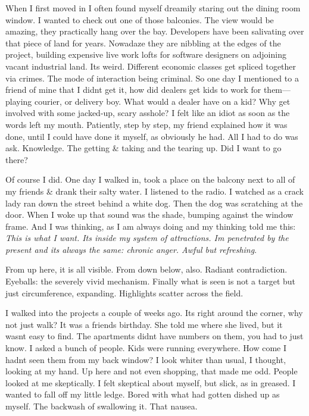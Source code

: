 \documentclass[
]{memoir}
\begin{document}
When I first moved in I often found myself dreamily staring out the
dining room window. I wanted to check out one of those balconies. The
view would be amazing, they practically hang over the bay. Developers
have been salivating over that piece of land for years. Nowadaze they
are nibbling at the edges of the project, building expensive live work
lofts for software designers on adjoining vacant industrial land. Its
weird. Different economic classes get spliced together via crimes. The
mode of interaction being criminal. So one day I mentioned to a friend
of mine that I didnt get it, how did dealers get kids to work for
them---playing courier, or delivery boy. What would a dealer have on a
kid? Why get involved with some jacked-up, scary asshole? I felt like an
idiot as soon as the words left my mouth. Patiently, step by step, my
friend explained how it was done, until I could have done it myself, as
obviously he had. All I had to do was ask. Knowledge. The getting \&
taking and the tearing up. Did I want to go there?

Of course I did. One day I walked in, took a place on the balcony next
to all of my friends \& drank their salty water. I listened to the
radio. I watched as a crack lady ran down the street behind a white dog.
Then the dog was scratching at the door. When I woke up that sound was
the shade, bumping against the window frame. And I was thinking, as I am
always doing and my thinking told me this: \emph{This is what I want.
Its inside my system of attractions. Im penetrated by the present and
its always the same: chronic anger. Awful but refreshing}.

From up here, it is all visible. From down below, also. Radiant
contradiction. Eyeballs: the severely vivid mechanism. Finally what is
seen is not a target but just circumference, expanding. Highlights
scatter across the field.

I walked into the projects a couple of weeks ago. Its right around the
corner, why not just walk? It was a friends birthday. She told me where
she lived, but it wasnt easy to find. The apartments didnt have numbers
on them, you had to just know. I asked a bunch of people. Kids were
running everywhere. How come I hadnt seen them from my back window? I
look whiter than usual, I thought, looking at my hand. Up here and not
even shopping, that made me odd. People looked at me skeptically. I felt
skeptical about myself, but slick, as in greased. I wanted to fall off
my little ledge. Bored with what had gotten dished up as myself. The
backwash of swallowing it. That nausea.
\end{document}

